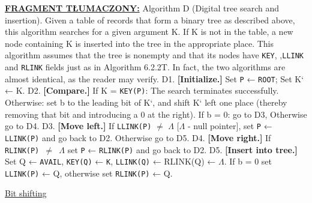 	\ifsourcematerial
	\begin{displayquote}
		\color{ao(english)}
		\underline{\textbf{FRAGMENT TŁUMACZONY:}} \newline 
		Algorithm D (Digital tree search and insertion). Given a table of records that
		form a binary tree as described above, this algorithm searches for a given
		argument K. If K is not in the table, a new node containing K is inserted into the
		tree in the appropriate place.
		This algorithm assumes that the tree is nonempty and that its nodes have \texttt{KEY}, ,\texttt{LLINK} and \texttt{RLINK} fields just as in Algorithm 6.2.2T. In fact, the two algorithms are almost identical, as the reader may verify. \newline
		D1. \textbf{[Initialize.]} \newline
		Set \texttt{P} ← \texttt{ROOT};
		Set K` ← K. \newline
		D2. \textbf{[Compare.]} \newline
		If K = \texttt{KEY(P)}: \newline
		\hspace{1cm} The search terminates successfully.
		Otherwise: \newline
		\hspace{1cm} set b to the leading bit of K`, and shift K` left one place \newline
		(thereby removing that bit and introducing a 0 at the right). \newline 
		\hspace{1cm} If b = 0: \newline
		\hspace{2cm} go to D3, \newline
		\hspace{1cm} Otherwise go to D4. \newline
		D3. \textbf{[Move left.]} \newline
		If \texttt{LLINK(P)} $\neq$ $\Lambda$ [$\Lambda$ - null pointer], set \texttt{P} ← \texttt{LLINK(P)} and go back to D2. Otherwise go to D5. \newline
		D4. \textbf{[Move right.]} \newline 
		If \texttt{RLINK(P) $\neq$ $\Lambda$} set \texttt{P} ← \texttt{RLINK(P)} and go back to D2. \newline
		D5. \textbf{[Insert into tree.]} \newline 
		Set Q ← \texttt{AVAIL}, \newline 
		\texttt{KEY(Q)} ← \texttt{K}, \newline
		\texttt{LLINK(Q)} ← RLINK(Q) ← $\Lambda$. \newline
		If b = 0 set \texttt{LLINK(P)} ← Q, otherwise set \texttt{RLINK(P)} ← Q.
		
		\color{graphcolorblue}
		\href{https://www.interviewcake.com/concept/java/bit-shift}{Bit shifting}
	\end{displayquote}
	\fi
	
